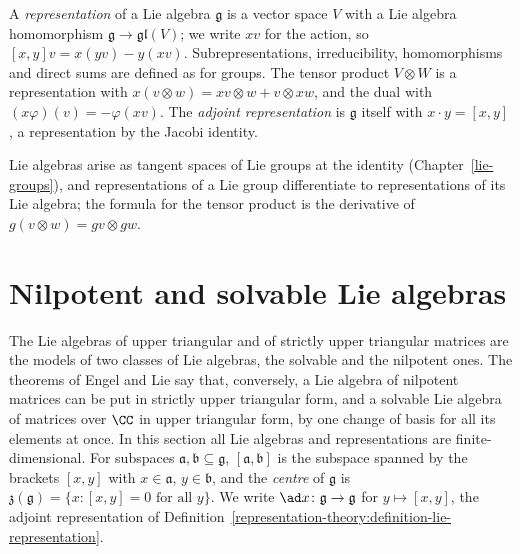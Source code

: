 \begin{definition}\label{representation-theory:definition-lie-representation}
A \emph{representation} of a Lie algebra $\mathfrak{g}$ is a vector space $V$ with a Lie algebra homomorphism
$\mathfrak{g} \to \mathfrak{gl}(V)$; we write $xv$ for the action, so $[x, y]v = x(yv) - y(xv)$. Subrepresentations,
irreducibility, homomorphisms and direct sums are defined as for groups. The tensor product $V \otimes W$ is a
representation with $x(v \otimes w) = xv \otimes w + v \otimes xw$, and the dual with $(x\varphi)(v) = -\varphi(xv)$. The
\emph{adjoint representation} is $\mathfrak{g}$ itself with $x \cdot y = [x, y]$, a representation by the Jacobi
identity.
\end{definition}

\begin{remark}\label{representation-theory:remark-lie-groups-algebras}
Lie algebras arise as tangent spaces of Lie groups at the identity (Chapter~\ref{lie-groups}), and
representations of a Lie group differentiate to representations of its Lie algebra; the formula for the tensor
product is the derivative of $g(v \otimes w) = gv \otimes gw$.
\end{remark}

\section{Nilpotent and solvable Lie algebras}\label{representation-theory:section-solvable}

The Lie algebras of upper triangular and of strictly upper triangular matrices are the models of two classes of Lie algebras, the solvable and the nilpotent ones.
The theorems of Engel and Lie say that, conversely, a Lie algebra of nilpotent matrices can be put in strictly upper triangular form, and a solvable Lie algebra of
matrices over $\CC$ in upper triangular form, by one change of basis for all its elements at once. In this section all Lie algebras and representations are
finite-dimensional. For subspaces $\mathfrak{a}, \mathfrak{b} \subseteq \mathfrak{g}$, $[\mathfrak{a}, \mathfrak{b}]$ is the subspace spanned by the brackets $[x, y]$
with $x \in \mathfrak{a}$, $y \in \mathfrak{b}$, and the \emph{centre} of $\mathfrak{g}$ is $\mathfrak{z}(\mathfrak{g}) = \{x : [x, y] = 0 \text{ for all } y\}$. We write
$\ad x \colon \mathfrak{g} \to \mathfrak{g}$ for $y \mapsto [x, y]$, the adjoint representation of Definition~\ref{representation-theory:definition-lie-representation}.

